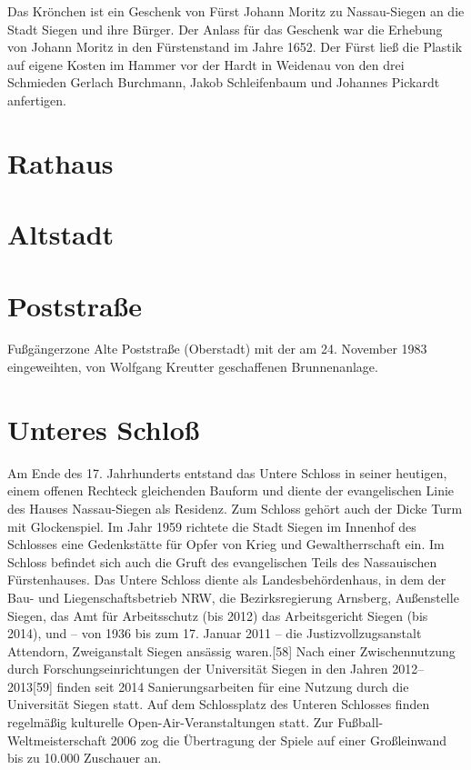 \documentclass[paper=a4, fontsize=11pt]{scrartcl} %
\numberwithin{equation}{section}		%
\numberwithin{figure}{section}			%
\numberwithin{table}{section}			%
\begin{document}
Das Krönchen ist ein Geschenk von Fürst Johann Moritz zu Nassau-Siegen an die Stadt Siegen und ihre Bürger. Der Anlass für das Geschenk war die Erhebung von Johann Moritz in den Fürstenstand im Jahre 1652. Der Fürst ließ die Plastik auf eigene Kosten im Hammer vor der Hardt in Weidenau von den drei Schmieden Gerlach Burchmann, Jakob Schleifenbaum und Johannes Pickardt anfertigen.

\section{Rathaus}

\section{Altstadt}

\section{Poststraße}
Fußgängerzone Alte Poststraße (Oberstadt) mit der am 24. November 1983 eingeweihten, von Wolfgang Kreutter geschaffenen Brunnenanlage.

\section{Unteres Schloß}
Am Ende des 17. Jahrhunderts entstand das Untere Schloss in seiner heutigen, einem offenen Rechteck gleichenden Bauform und diente der evangelischen Linie des Hauses Nassau-Siegen als Residenz. Zum Schloss gehört auch der Dicke Turm mit Glockenspiel. Im Jahr 1959 richtete die Stadt Siegen im Innenhof des Schlosses eine Gedenkstätte für Opfer von Krieg und Gewaltherrschaft ein. Im Schloss befindet sich auch die Gruft des evangelischen Teils des Nassauischen Fürstenhauses.  Das Untere Schloss diente als Landesbehördenhaus, in dem der Bau- und Liegenschaftsbetrieb NRW, die Bezirksregierung Arnsberg, Außenstelle Siegen, das Amt für Arbeitsschutz (bis 2012) das Arbeitsgericht Siegen (bis 2014), und – von 1936 bis zum 17. Januar 2011 – die Justizvollzugsanstalt Attendorn, Zweiganstalt Siegen ansässig waren.[58] Nach einer Zwischennutzung durch Forschungseinrichtungen der Universität Siegen in den Jahren 2012–2013[59] finden seit 2014 Sanierungsarbeiten für eine Nutzung durch die Universität Siegen statt. Auf dem Schlossplatz des Unteren Schlosses finden regelmäßig kulturelle Open-Air-Veranstaltungen statt. Zur Fußball-Weltmeisterschaft 2006 zog die Übertragung der Spiele auf einer Großleinwand bis zu 10.000 Zuschauer an.
\end{document}
